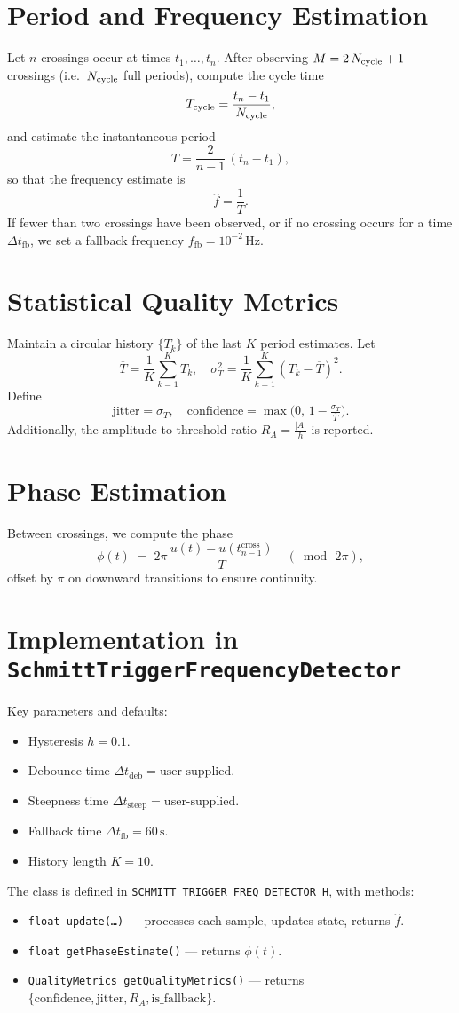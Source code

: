 \documentclass[11pt,letterpaper]{article}
\begin{document}
\section{Period and Frequency Estimation}
Let \(n\) crossings occur at times \(t_1,\dots,t_n\).  After observing \(M=2\,N_{\rm cycle}+1\) crossings (i.e.\ \(N_{\rm cycle}\) full periods), compute the cycle time
\[
T_{\rm cycle}
= \frac{t_{n} - t_{1}}{\,N_{\rm cycle}\,},
\]
and estimate the instantaneous period
\[
T = \frac{2}{n-1}\,(t_{n} - t_{1}),
\]
so that the frequency estimate is
\[
\hat f = \frac{1}{T}.
\]
If fewer than two crossings have been observed, or if no crossing occurs for a time
\(\Delta t_{\mathrm{fb}}\), we set a fallback frequency
\(\displaystyle f_{\mathrm{fb}} = 10^{-2}\,\mathrm{Hz}.\)

\section{Statistical Quality Metrics}
Maintain a circular history \(\{T_k\}\) of the last \(K\) period estimates.  Let
\[
\overline{T} = \frac1K\sum_{k=1}^K T_k,
\quad
\sigma_T^2 = \frac1K\sum_{k=1}^K (T_k-\overline{T})^2.
\]
Define
\[
\text{jitter} = \sigma_T,
\quad
\text{confidence} = \max\bigl(0,\,1 - \tfrac{\sigma_T}{\overline{T}}\bigr).
\]
Additionally, the amplitude‐to‐threshold ratio
\(\displaystyle R_A = \frac{|A|}{h}\) is reported.

\section{Phase Estimation}
Between crossings, we compute the phase
\[
\phi(t) \;=\; 2\pi\,\frac{u(t) - u(t_{n-1}^{\mathrm{cross}})}{T}
\quad (\bmod\,2\pi),
\]
offset by \(\pi\) on downward transitions to ensure continuity.

\section{Implementation in \texttt{SchmittTriggerFrequencyDetector}}
Key parameters and defaults:
\begin{itemize}
  \item Hysteresis \(h=0.1\).
  \item Debounce time \(\Delta t_{\mathrm{deb}}= \text{user‐supplied}\).
  \item Steepness time \(\Delta t_{\mathrm{steep}}= \text{user‐supplied}\).
  \item Fallback time \(\Delta t_{\mathrm{fb}}=60\,\mathrm{s}\).
  \item History length \(K=10\).
\end{itemize}
The class is defined in \texttt{SCHMITT\_TRIGGER\_FREQ\_DETECTOR\_H}, with methods:
\begin{itemize}
  \item \texttt{float update(…)} — processes each sample, updates state, returns \(\hat f\).
  \item \texttt{float getPhaseEstimate()} — returns \(\phi(t)\).
  \item \texttt{QualityMetrics getQualityMetrics()} — returns \(\{\mathrm{confidence},\mathrm{jitter},R_A,\mathrm{is\_fallback}\}\).
\end{itemize}
\end{document}
